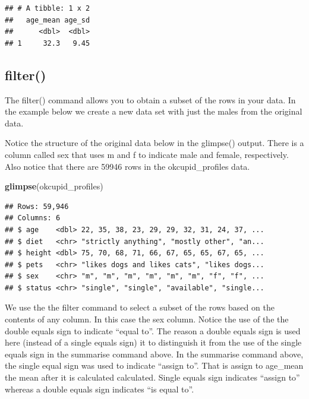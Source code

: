 \documentclass[
]{krantz}
\makeatletter
\newenvironment{Shaded}{\begin{snugshade}}{\end{snugshade}}
\newcommand{\KeywordTok}[1]{\textcolor[rgb]{0.27,0.27,0.27}{\textbf{#1}}}
\newcommand{\NormalTok}[1]{#1}
\newcommand{\OperatorTok}[1]{\textcolor[rgb]{0.43,0.43,0.43}{\textbf{#1}}}
\newcommand{\StringTok}[1]{\textcolor[rgb]{0.5,0.5,0.5}{#1}}
\newenvironment{kframe}{%
\medskip{}
\setlength{\fboxsep}{.8em}
 \def\at@end@of@kframe{}%
 \ifinner\ifhmode%
  \def\at@end@of@kframe{\end{minipage}}%
  \begin{minipage}{\columnwidth}%
 \fi\fi%
 \def\FrameCommand##1{\hskip\@totalleftmargin \hskip-\fboxsep
 \colorbox{shadecolor}{##1}\hskip-\fboxsep
     \hskip-\linewidth \hskip-\@totalleftmargin \hskip\columnwidth}%
 \MakeFramed {\advance\hsize-\width
   \@totalleftmargin\z@ \linewidth\hsize
   \@setminipage}}%
 {\par\unskip\endMakeFramed%
 \at@end@of@kframe}
\renewenvironment{Shaded}{\begin{kframe}}{\end{kframe}}
\makeatother
\begin{document}
\begin{verbatim}
## # A tibble: 1 x 2
##   age_mean age_sd
##      <dbl>  <dbl>
## 1     32.3   9.45
\end{verbatim}

\hypertarget{filter}{%
\subsection{filter()}\label{filter}}

The filter() command allows you to obtain a subset of the rows in your data. In the example below we create a new data set with just the males from the original data.

Notice the structure of the original data below in the glimpse() output. There is a column called sex that uses m and f to indicate male and female, respectively. Also notice that there are 59946 rows in the okcupid\_profiles data.

\begin{Shaded}
\begin{Highlighting}[]
\KeywordTok{glimpse}\NormalTok{(okcupid_profiles)}
\end{Highlighting}
\end{Shaded}

\begin{verbatim}
## Rows: 59,946
## Columns: 6
## $ age    <dbl> 22, 35, 38, 23, 29, 29, 32, 31, 24, 37, ...
## $ diet   <chr> "strictly anything", "mostly other", "an...
## $ height <dbl> 75, 70, 68, 71, 66, 67, 65, 65, 67, 65, ...
## $ pets   <chr> "likes dogs and likes cats", "likes dogs...
## $ sex    <chr> "m", "m", "m", "m", "m", "m", "f", "f", ...
## $ status <chr> "single", "single", "available", "single...
\end{verbatim}

We use the the filter command to select a subset of the rows based on the contents of any column. In this case the sex column. Notice the use of the the double equals sign to indicate ``equal to''. The reason a double equals sign is used here (instead of a single equals sign) it to distinguish it from the use of the single equals sign in the summarise command above. In the summarise command above, the single equal sign was used to indicate ``assign to''. That is assign to age\_mean the mean after it is calculated calculated. Single equals sign indicates ``assign to'' whereas a double equals sign indicates ``is equal to''.

\begin{Shaded}
\end{Shaded}
\end{document}
